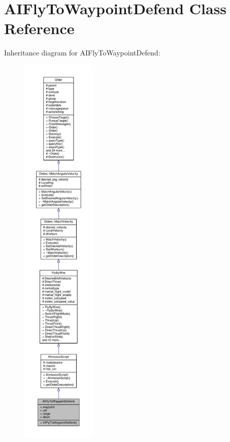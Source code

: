 \hypertarget{classAIFlyToWaypointDefend}{}\section{A\+I\+Fly\+To\+Waypoint\+Defend Class Reference}
\label{classAIFlyToWaypointDefend}


Inheritance diagram for A\+I\+Fly\+To\+Waypoint\+Defend\+:
\nopagebreak
\begin{figure}[H]
\begin{center}
\leavevmode
\includegraphics[height=550pt]{d2/d79/classAIFlyToWaypointDefend__inherit__graph}
\end{center}
\end{figure}


